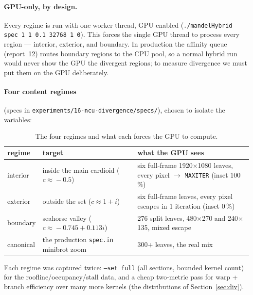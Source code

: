 \documentclass[
	english,
	letterpaper, oneside
]{article}
\begin{document}
\paragraph{GPU-only, by design.} Every regime is run with one worker thread,
GPU enabled (\texttt{./mandelHybrid spec 1 1 0.1 32768 1 0}). This forces the
single GPU thread to process every region --- interior, exterior, and
boundary. In production the affinity queue (report~12) routes boundary regions to
the CPU pool, so a normal hybrid run would never show the GPU the divergent
regions; to measure divergence we must put them on the GPU deliberately.

\paragraph{Four content regimes} (specs in \texttt{experiments/16-ncu-divergence/specs/}),
chosen to isolate the variables:

\begin{table}[H]
    \centering
    \caption{The four regimes and what each forces the GPU to compute.}
    \label{tab:regimes}
    \begin{tabular}{llp{7.6cm}}
        \hline
        regime & target & what the GPU sees \\
        \hline
        interior  & inside the main cardioid ($c\!\approx\!-0.5$) & six full-frame 1920$\times$1080 leaves, every pixel $\to$ \texttt{MAXITER} (inset 100\,\%) \\
        exterior  & outside the set ($c\!\approx\!1\!+\!i$)        & six full-frame leaves, every pixel escapes in 1 iteration (inset 0\,\%) \\
        boundary  & seahorse valley ($c\!\approx\!-0.745\!+\!0.113i$) & 276 split leaves, 480$\times$270 and 240$\times$135, mixed escape \\
        canonical & the production \texttt{spec.in} minibrot zoom  & 300+ leaves, the real mix \\
        \hline
    \end{tabular}
\end{table}

Each regime was captured twice: \texttt{--set full} (all sections, bounded kernel
count) for the roofline/occupancy/stall data, and a cheap two-metric pass for
warp + branch efficiency over many more kernels (the distributions of
Section~\ref{sec:div}).
\end{document}

